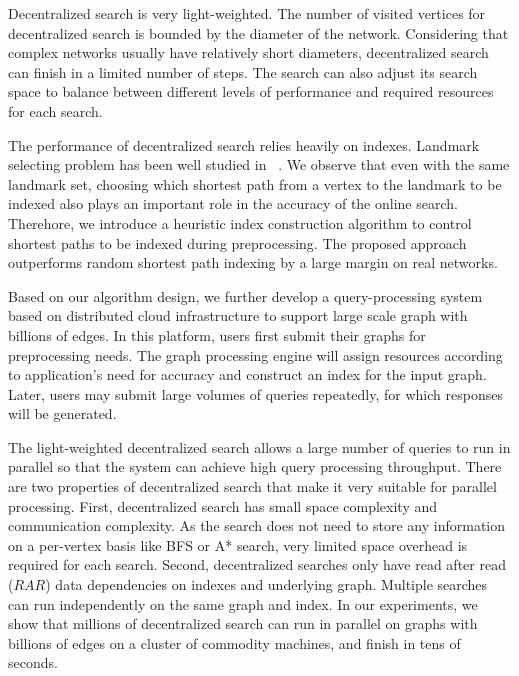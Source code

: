 Decentralized search is very light-weighted. The number of visited vertices for decentralized search is bounded by the diameter of the network. Considering that complex networks usually have relatively short diameters, decentralized search can finish in a limited number of steps. The search can also adjust its search space to balance between different levels of performance and required resources for each search. %

The performance of decentralized search relies heavily on indexes. Landmark selecting problem has been well studied in ~\cite{Potamias:2009:FSP:1645953.1646063,6927522}. We observe that even with the same landmark set, choosing which shortest path from a vertex to the landmark to be indexed also plays an important role in the accuracy of the online search. %
Therehore, we introduce a heuristic index construction algorithm to control shortest paths to be indexed during preprocessing. The proposed approach outperforms random shortest path indexing by a large margin on real networks.

Based on our algorithm design, we further develop a query-processing system based on distributed cloud infrastructure to support large scale graph with billions of edges. In this platform, users first submit their graphs for preprocessing needs. The graph processing engine will assign resources according to application's need for accuracy and construct an index for the input graph. Later, users may submit large volumes of queries repeatedly, for which responses will be generated. %

The light-weighted decentralized search allows a large number of queries to run in parallel so that the system can achieve high query processing throughput. There are two properties of decentralized search that make it very suitable for parallel processing. First, decentralized search has small space complexity and communication complexity. As the search does not need to store any information on a per-vertex basis like BFS or A* search, very limited space overhead is required for each search. Second, decentralized searches only have read after read ($RAR$) data dependencies on indexes and underlying graph. Multiple searches can run independently on the same graph and index. 
In our experiments, we show that millions of decentralized search can run in parallel on graphs with billions of edges on a cluster of commodity machines, and finish in tens of seconds.

